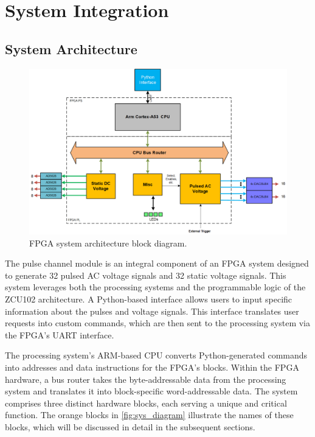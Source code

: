 \chapter{System Integration}

\section{System Architecture}

\begin{figure}[h]
    \centering
    \includegraphics[width=1\linewidth]{figures/5.1.png}
    \caption{FPGA system architecture block diagram.}
    \label{fig:sys_diagram}
\end{figure}

The pulse channel module is an integral component of an FPGA system designed to generate 32 pulsed AC voltage signals and 32 static voltage signals. This system leverages both the processing systems and the programmable logic of the ZCU102 architecture. A Python-based interface allows users to input specific information about the pulses and voltage signals. This interface translates user requests into custom commands, which are then sent to the processing system via the FPGA's UART interface.

The processing system's ARM-based CPU converts Python-generated commands into addresses and data instructions for the FPGA's blocks. Within the FPGA hardware, a bus router takes the byte-addressable data from the processing system and translates it into block-specific word-addressable data. The system comprises three distinct hardware blocks, each serving a unique and critical function. The orange blocks in \autoref{fig:sys_diagram} illustrate the names of these blocks, which will be discussed in detail in the subsequent sections.

